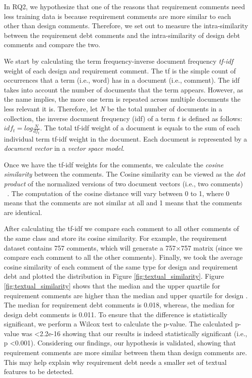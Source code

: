 In RQ2, we hypothesize that one of the reasons that requirement \SATD comments need less training data is because requirement \SATD comments are more similar to each other than design \SATD comments. Therefore, we set out to measure the intra-similarity between the requirement debt comments and the intra-similarity of design debt comments and compare the two.

We start by calculating the term frequency-inverse document frequency \textit{tf-idf} weight of each design and requirement \SATD comment. The tf is the simple count of occurrences that a term (i.e., word) has in a document (i.e., comment). The idf takes into account the number of documents that the term appears. However, as the name implies, the more one term is repeated across multiple documents the less relevant it is. Therefore, let \textit{N} be the total number of documents in a collection, the inverse document frequency (idf) of a term \textit{t} is defined as follows: \(idf_{t} = log\frac{N}{df_{t}}\). The total tf-idf weight of a document is equals to the sum of each individual term tf-idf weight in the document. Each document is represented by a \textit{document vector} in a \textit{vector space model}. 

Once we have the tf-idf weights for the comments, we calculate the \textit{cosine similarity} between the comments. The Cosine similarity can be viewed as the \textit{dot product} of the normalized versions of two document vectors (i.e., two comments) ~\cite{Manning2008book}. The computation of the cosine distance will vary between 0 to 1, where 0 means that the comments are not similar at all and 1 means that the comments are identical.

After calculating the tf-idf we compare each comment to all other comments of the same class and store its cosine similarity. For example, the requirement \SATD dataset contains 757 comments, which will generate a 757$\times$757 matrix (since we compare each comment to all the other comments). Finally, we took the average cosine similarity of each comment of the same type for design and requirement debt and plotted the distribution in Figure \ref{fig:textual_similarity}. Figure \ref{fig:textual_similarity} shows that the median and the upper quartile for requirement \SATD comments are higher than the median and upper quartile for design \SATD. The median for requirement debt comments is 0.018, whereas, the median for design debt comments is 0.011. To ensure that the difference is statistically significant, we perform a Wilcox test to calculate the p-value. The calculated p-value was \textless 2.2e-16 showing that our results is indeed statistically significant (i.e., p \textless 0.001). Considering our findings, our hypothesis is validated, showing that requirement \SATD comments are more similar between them than design \SATD comments are. This may help explain why requirement debt needs a smaller set of textual features to be detected.

